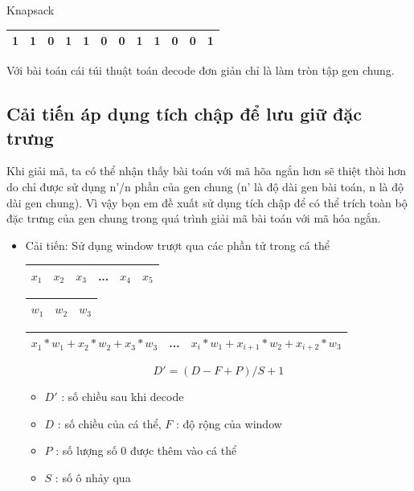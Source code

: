 \documentclass[a4paper,12pt]{report}
\begin{document}
Knapsack
\begin{longtable}{|c|c|c|c|c|c|c|c|c|c|c|c|}
\hline
1& 1& 0& 1& 1& 0&0&1&1&0&0&1\\
\hline
\end{longtable}
Với bài toán cái túi thuật toán decode đơn giản chỉ là làm tròn tập gen chung.
\subsection{Cải tiến áp dụng tích chập để lưu giữ đặc trưng}
Khi giải mã, ta có thể nhận thấy bài toán với mã hõa ngắn hơn sẽ thiệt thòi hơn do chỉ được sử dụng n'/n phần của gen chung (n' là độ dài gen bài toán, n là độ dài gen chung). Vì vậy bọn em đề xuất sử dụng tích chập để có thể trích toàn bộ đặc trưng của gen chung trong quá trình giải mã bài toán với mã hóa ngắn.

\begin{itemize}

\item Cải tiến: Sử dụng window trượt qua các phần tử trong cá thể
\begin{longtable}{|c|c|c|c|c|c|}
\hline
$x_1$ & $x_2$ & $x_3$ & ... & $x_4$ & $x_5$ \\
\hline
\end{longtable}
\begin{longtable}{|c|c|c|}
\hline
$w_1$ & $w_2$ & $w_3$\\
\hline
\end{longtable}
\begin{longtable}{|c|c|c|}
\hline
$x_1*w_1+x_2*w_2+x_3*w_3$ & ... & $x_i*w_1+x_{i+1}*w_2+x_{i+2}*w_3$\\
\hline
\end{longtable}

$$D' = (D-F+P)/S + 1$$
\begin{itemize}
\item $D'$ : số chiều sau khi decode
\item $D$ : số chiều của cá thể, $F$ : độ rộng của window
\item $P$ : số lượng số 0 được thêm vào cá thể 
\item $S$ : số ô nhảy qua  
\end{itemize}
\end{itemize}
\end{document}
